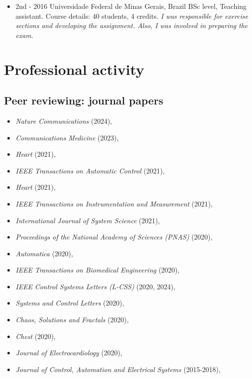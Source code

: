 \documentclass[10pt,A4]{article} %
\begin{document}
\begin{itemize}
    \item {}
    {   2nd - 2016  }
    { Universidade Federal de Minas Gerais, Brazil }
    {  BSc level, Teaching assistant. Course details: 40 students, 4 credits.  \emph{ I was responsible for exercise sections and developing the assignment. Also, I was involved in preparing the exam. } }
    
\end{itemize}



\section{Professional activity}

\subsection{Peer reviewing: journal papers}

\begin{itemize}
 \item {\em Nature Communications } (2024),  \item {\em Communications Medicine } (2023),  \item {\em Heart } (2021),  \item {\em IEEE Transactions on Automatic Control } (2021),  \item {\em Heart } (2021),  \item {\em IEEE Transactions on Instrumentation and Measurement } (2021),  \item {\em International Journal of System Science } (2021),  \item {\em Proceedings of the National Academy of Sciences (PNAS) } (2020),  \item {\em Automatica } (2020),  \item {\em IEEE Transactions on Biomedical Engineering } (2020),  \item {\em IEEE Control Systems Letters (L-CSS) } (2020, 2024),  \item {\em Systems and Control Letters } (2020),  \item {\em Chaos, Solutions and Fractals } (2020),  \item {\em Chest } (2020),  \item {\em Journal of Electrocardiology } (2020),  \item {\em Journal of Control, Automation and Electrical Systems } (2015-2018), 
\end{itemize}
\end{document}
